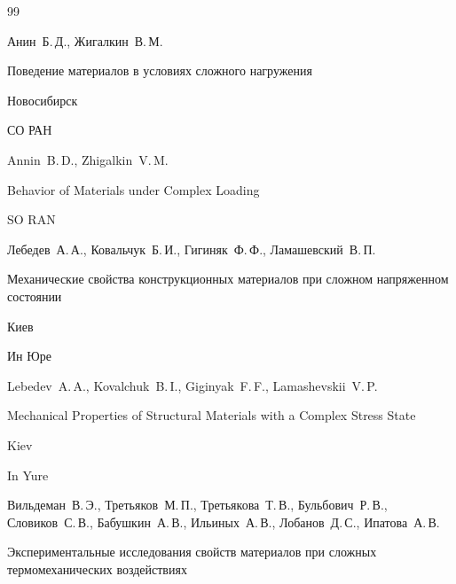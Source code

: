 \begin{thebibliography}{99}




\by Анин~Б.\,Д., Жигалкин~В.\,М.

\book Поведение материалов в условиях сложного нагружения

\publaddr Новосибирск

\publ СО РАН



\misctransl

\by  Annin~B.\,D., Zhigalkin~V.\,M.

\book Behavior of Materials under Complex Loading 

\publ SO RAN








\by Лебедев~А.\,А., Ковальчук~Б.\,И., Гигиняк~Ф.\,Ф., Ламашевский~В.\,П.

\book Механические свойства конструкционных материалов при сложном напряженном состоянии

\publaddr Киев

\publ Ин Юре



\misctransl

\by Lebedev~A.\,A., Kovalchuk~B.\,I., Giginyak~F.\,F., Lamashevskii~V.\,P. 

\book Mechanical Properties of Structural Materials with a Complex Stress State 

\publaddr Kiev

\publ In Yure










\by  Вильдеман~В.\,Э., Третьяков~М.\,П., Третьякова~Т.\,В., Бульбович~Р.\,В., Словиков~С.\,В., Бабушкин~А.\,В., Ильиных~А.\,В., Лобанов~Д.\,С., Ипатова~А.\,В.

\book Экспериментальные исследования свойств материалов при сложных термомеханических воздействиях


\end{thebibliography}
